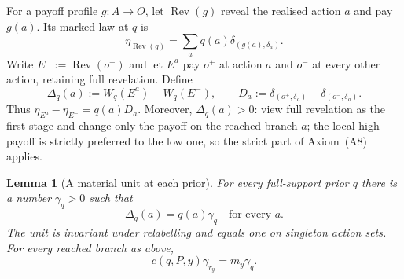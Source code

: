 \documentclass[11pt,a4paper]{article}
\newtheorem{lemma}[theorem]{Lemma}
\theoremstyle{definition}
\newcommand{\1}{\mathbf 1}
\begin{document}
For a payoff profile $g:A\to O$, let $\operatorname{Rev}(g)$ reveal the
realised action $a$ and pay $g(a)$.  Its marked law at $q$ is
\begin{equation}
 \eta_{\operatorname{Rev}(g)}
 =\sum_a q(a)\delta_{(g(a),\delta_a)}.
 \label{mf:eq:revelation-law}
\end{equation}
Write $E^-:=\operatorname{Rev}(o^-)$ and let $E^a$ pay $o^+$ at action
$a$ and $o^-$ at every other action, retaining full revelation.  Define
\begin{equation}
 \Delta_q(a):=W_q(E^a)-W_q(E^-),\qquad
 D_a:=\delta_{(o^+,\delta_a)}-\delta_{(o^-,\delta_a)}.
 \label{mf:eq:revealed-upgrade}
\end{equation}
Thus $\eta_{E^a}-\eta_{E^-}=q(a)D_a$.  Moreover, $\Delta_q(a)>0$:
view full revelation as the first stage and change only the payoff on the
reached branch $a$; the local high payoff is strictly preferred to the low
one, so the strict part of Axiom~\textup{(A8)} applies.

\begin{lemma}[A material unit at each prior]\label{mf:lem:material-units}
For every full-support prior $q$ there is a number $\gamma_q>0$ such that
\begin{equation}
 \Delta_q(a)=q(a)\gamma_q\quad\text{for every }a.
 \label{mf:eq:upgrade-unit}
\end{equation}
The unit is invariant under relabelling and equals one on singleton action
sets.  For every reached branch as above,
\begin{equation}
 c(q,P,y)\gamma_{r_y}=m_y\gamma_q.
 \label{mf:eq:unit-ratio}
\end{equation}
\end{lemma}
\end{document}
